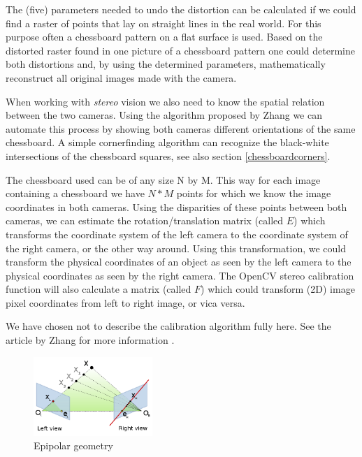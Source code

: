 \documentclass[a4paper]{article}
\begin{document}
The (five) parameters needed to undo the distortion can be calculated if we
could find a raster of points that lay on straight lines in the real world.
For this purpose often a chessboard pattern on a flat surface is used.
Based on the distorted raster found in one picture of a chessboard pattern
one could determine both distortions and, by using the determined parameters,
mathematically reconstruct all original images made with the camera.

When working with \emph{stereo} vision we also need to know the spatial
relation between the two cameras. Using the algorithm proposed by Zhang
\cite{zhang1999} we can automate this process by showing both cameras
different orientations of the same chessboard. A simple cornerfinding algorithm
can recognize the black-white intersections of the chessboard squares, see
also section \ref{chessboardcorners}.

The chessboard used can be of any size N by M. This way for each image
containing a chessboard we have $N*M$ points for which we know the image
coordinates in both cameras. Using the disparities of these points between
both cameras, we can estimate the rotation/translation matrix (called $E$)
which transforms the coordinate system of the left camera to the coordinate
system of the right camera, or the other way around. Using this transformation,
we could transform the physical coordinates of an object as seen by the left
camera to the physical coordinates as seen by the right camera.
The OpenCV stereo calibration function will also calculate a matrix (called
$F$) which could transform (2D) image pixel coordinates from left to right
image, or vica versa.

We have chosen not to describe the calibration algorithm fully here.
See the article by Zhang for more information \cite{zhang1999}.

\begin{figure}[h!bt]
  \centering
  \includegraphics[width=0.4\textwidth]{epistandard}
  \caption{Epipolar geometry}
  \label{epi}
\end{figure}
\end{document}
